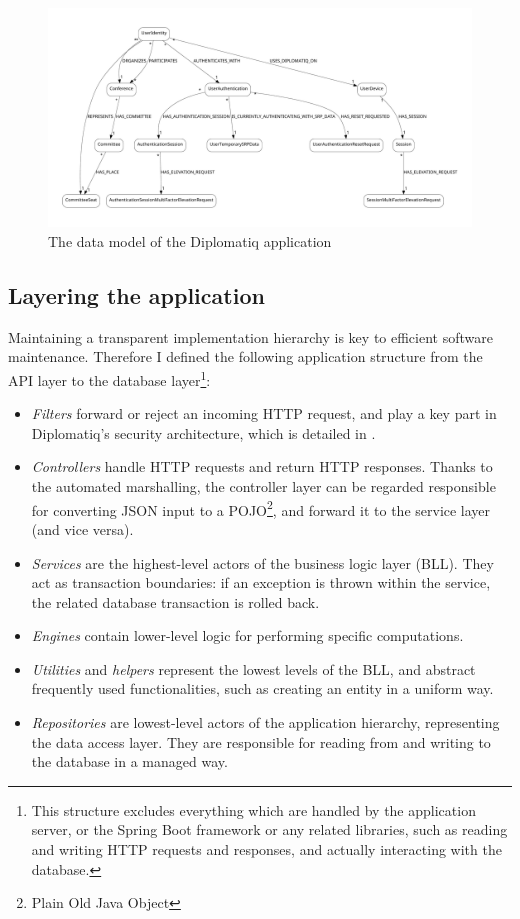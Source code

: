 \begin{figure}
    \centering
    \includegraphics[width=\textheight]{figures/data-model.pdf}
    \caption{The data model of the Diplomatiq application}
    \label{fig:data-model}
\end{figure}

\subsection{Layering the application}

Maintaining a transparent implementation hierarchy is key to efficient software maintenance. Therefore I defined the following application structure from the API layer to the database layer\footnote{This structure excludes everything which are handled by the application server, or the Spring Boot framework or any related libraries, such as reading and writing HTTP requests and responses, and actually interacting with the database.}:

\begin{itemize}
\item \emph{Filters} forward or reject an incoming HTTP request, and play a key part in Diplomatiq's security architecture, which is detailed in .
\item \emph{Controllers} handle HTTP requests and return HTTP responses. Thanks to the automated marshalling, the controller layer can be regarded responsible for converting JSON input to a POJO\footnote{Plain Old Java Object}, and forward it to the service layer (and vice versa).
\item \emph{Services} are the highest-level actors of the business logic layer (BLL). They act as transaction boundaries: if an exception is thrown within the service, the related database transaction is rolled back.
\item \emph{Engines} contain lower-level logic for performing specific computations.
\item \emph{Utilities} and \emph{helpers} represent the lowest levels of the BLL, and abstract frequently used functionalities, such as creating an entity in a uniform way.
\item \emph{Repositories} are lowest-level actors of the application hierarchy, representing the data access layer. They are responsible for reading from and writing to the database in a managed way.
\end{itemize}

